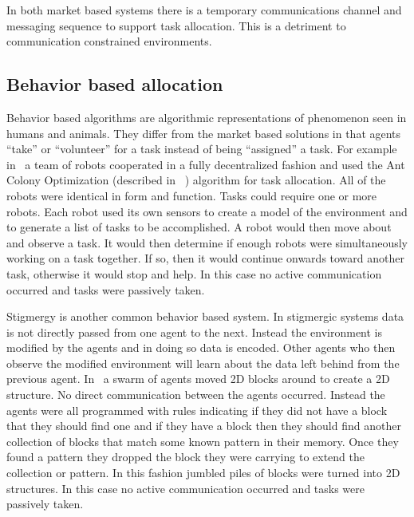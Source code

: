 In both market based systems there is a temporary communications channel and messaging sequence to support task allocation.  This is a detriment to communication constrained environments.

\subsection{Behavior based allocation}

Behavior based algorithms are algorithmic representations of phenomenon seen in humans and animals. They differ from the market based solutions in that agents ``take'' or ``volunteer'' for a task instead of being ``assigned'' a task.  For example in~\cite{ant_colony_opt} a team of robots cooperated in a fully decentralized fashion and used the Ant Colony Optimization (described in ~\cite{wiki:aco}) algorithm for task allocation.  All of the robots were identical in form and function.  Tasks could require one or more robots.  Each robot used its own sensors to create a model of the environment and to generate a list of tasks to be accomplished.  A robot would then move about and observe a task.  It would then determine if enough robots were simultaneously working on a task together.  If so, then it would continue onwards toward another task, otherwise it would stop and help.  In this case no active communication occurred and tasks were passively taken.

Stigmergy is another common behavior based system.  In stigmergic systems data is not directly passed from one agent to the next.  Instead the environment is modified by the agents and in doing so data is encoded.  Other agents who then observe the modified environment will learn about the data left behind from the previous agent.  In~\cite{stigmergy_building} a swarm of agents moved 2D blocks around to create a 2D structure.  No direct communication between the agents occurred.  Instead the agents were all programmed with rules indicating if they did not have a block that they should find one and if they have a block then they should find another collection of blocks that match some known pattern in their memory.  Once they found a pattern they dropped the block they were carrying to extend the collection or pattern.  In this fashion jumbled piles of blocks were turned into 2D structures.  In this case no active communication occurred and tasks were passively taken.

